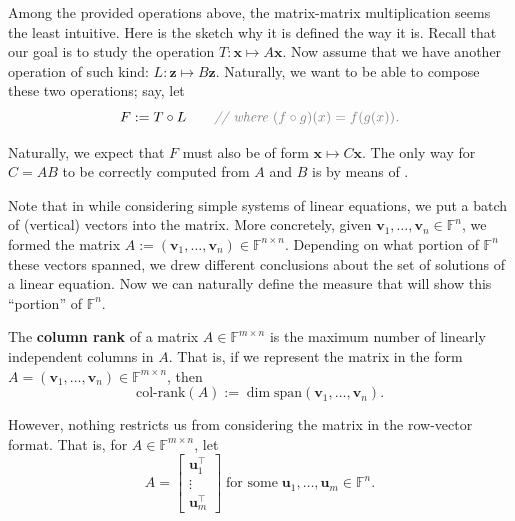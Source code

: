 \documentclass[../../book.tex]{subfiles}
\begin{document}
\begin{remark}
    Among the provided operations above, the matrix-matrix multiplication seems the least intuitive.
    Here is the sketch why it is defined the way it is. 
    Recall that our goal is to study the operation $T: \mathbf{x} \mapsto A\mathbf{x}$.
    Now assume that we have another operation of such kind: $L: \mathbf{z} \mapsto B\mathbf{z}$.
    Naturally, we want to be able to compose these two operations; say, let
    \begin{equation*}
        F := T \circ L \qquad \textcolor{gray}{\textit{// where $(f \circ g)(x) = f(g(x))$.}}
    \end{equation*}
    
    Naturally, we expect that $F$ must also be of form $\mathbf{x} \mapsto C\mathbf{x}$.
    The only way for $C=AB$ to be correctly computed from $A$ and $B$ is by means of .
\end{remark}

Note that in  while considering simple systems of linear equations, we put a batch of (vertical) vectors into the matrix.
More concretely, given $\mathbf{v}_1,\dots,\mathbf{v}_n \in \mathbb{F}^n$, we formed the matrix $A := (\mathbf{v}_1,\dots,\mathbf{v}_n) \in \mathbb{F}^{n \times n}$.
Depending on what portion of $\mathbb{F}^n$ these vectors spanned, we drew different conclusions about the set of solutions of a linear equation.
Now we can naturally define the measure that will show this ``portion'' of $\mathbb{F}^n$.

\begin{definition}
    The \textbf{column rank} of a matrix $A \in \mathbb{F}^{m \times n}$ is the maximum number of linearly independent columns in $A$. 
    That is, if we represent the matrix in the form $A=(\mathbf{v}_1,\dots,\mathbf{v}_n) \in \mathbb{F}^{m \times n}$, then
    \begin{equation*}
        \text{col-rank}(A) := \dim \text{span}(\mathbf{v}_1,\dots,\mathbf{v}_n).
    \end{equation*}
\end{definition}

However, nothing restricts us from considering the matrix in the row-vector format.
That is, for $A \in \mathbb{F}^{m \times n}$, let
\begin{equation*}
    A = \begin{bmatrix}
        \mathbf{u}_1^{\top} \\
        \vdots \\
        \mathbf{u}_m^{\top}
    \end{bmatrix} \; \text{for some} \; \mathbf{u}_1,\dots,\mathbf{u}_m \in \mathbb{F}^n.
\end{equation*}
\end{document}
